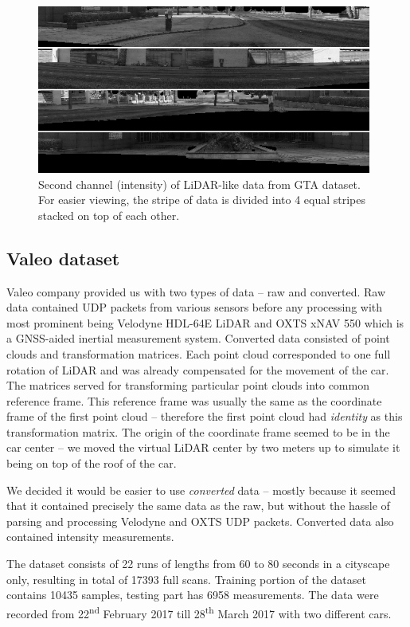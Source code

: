 \begin{figure}[H]
\centering
\includegraphics[width=0.98\textwidth,keepaspectratio]{img/gtalidarinten.png}
\caption[Second channel of LiDAR-like data from GTA dataset]{Second channel (intensity) of LiDAR-like data from GTA dataset. For easier viewing, the stripe of data is divided into 4 equal stripes stacked on top of each other.}
\label{gtalidarinten}
\end{figure}

\subsection{Valeo dataset}
Valeo company provided us with two types of data -- raw and converted. Raw data contained UDP packets from various sensors before any processing with most prominent being Velodyne HDL-64E LiDAR and OXTS xNAV 550 which is a GNSS-aided inertial measurement system. Converted data consisted of point clouds and transformation matrices. Each point cloud corresponded to one full rotation of LiDAR and was already compensated for the movement of the car. The matrices served for transforming particular point clouds into common reference frame. This reference frame was usually the same as the coordinate frame of the first point cloud -- therefore the first point cloud had {\em identity} as this transformation matrix. The origin of the coordinate frame seemed to be in the car center -- we moved the virtual LiDAR center by two meters up to simulate it being on top of the roof of the car.

We decided it would be easier to use {\em converted} data -- mostly because it seemed that it contained precisely the same data as the raw, but without the hassle of parsing and processing Velodyne and OXTS UDP packets. Converted data also contained intensity measurements.

The dataset consists of 22 runs of lengths from 60 to 80 seconds in a cityscape only, resulting in total of 17393 full scans. Training portion of the dataset contains 10435 samples, testing part has 6958 measurements. The data were recorded from 22\textsuperscript{nd} February 2017 till 28\textsuperscript{th} March 2017 with two different cars.

